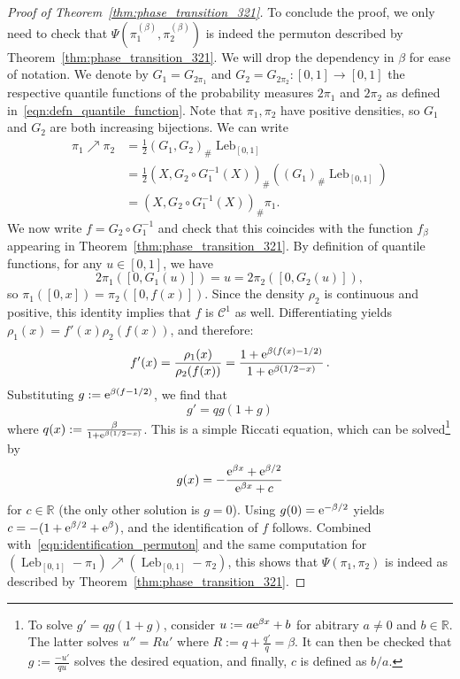 \documentclass[a4paper,11pt]{amsart}
\newcommand{\ee}{\textup{e}}
\newcommand{\R}{\mathbb R}
\DeclareMathOperator{\Leb}{Leb}
\theoremstyle{definition}
\begin{document}
\begin{proof}[Proof of Theorem~\ref{thm:phase_transition_321}]
    To conclude the proof, we only need to check that $\Psi\left( \pi_1^{(\beta)}, \pi_2^{(\beta)} \right)$ is indeed the permuton described by Theorem~\ref{thm:phase_transition_321}. We will drop the dependency in $\beta$ for ease of notation. We denote by $G_1 = G_{2\pi_1}$ and $G_2=G_{2\pi_2} : \left[0,1 \right] \to [0,1]$ the respective quantile functions of the probability measures $2\pi_1$ and $2\pi_2$ as defined in~\eqref{eqn:defn_quantile_function}. Note that $\pi_1, \pi_2$ have positive densities, so $G_1$ and $G_2$ are both increasing bijections. We can write
    \begin{align}
    	\pi_1 \nearrow \pi_2 &= \frac{1}{2} \left( G_1, G_2 \right)_{\#}  \Leb_{[0,1]} \nonumber \\
    	&= \frac{1}{2} \left( X, G_2 \circ G_1^{-1}(X) \right)_{\#} \left( (G_1)_{\#} \Leb_{[0,1]}\right) \nonumber \\
    	&=  \left( X, G_2 \circ G_1^{-1}(X) \right)_{\#} \pi_1. \label{eqn:identification_permuton}
    \end{align}
    We now write $f=G_2 \circ G_1^{-1}$ and check that this coincides with the function $f_{\beta}$ appearing in Theorem~\ref{thm:phase_transition_321}. By definition of quantile functions, for any $u \in [0,1]$, we have
    \[ 2\pi_1 \left( \left[ 0,G_1(u)\right] \right) = u = 2\pi_2 \left( \left[ 0,G_2(u)\right] \right), \]
    so $\pi_1([0,x]) = \pi_2([0,f(x)])$. Since the density $\rho_2$ is continuous and positive, this identity implies that $f$ is $\mathcal C^1$ as well.
    Differentiating yields $\rho_1(x) = f'(x) \rho_2(f(x))$, and therefore:
    \begin{equation*}
    f'(x) = \frac{\rho_1(x)}{\rho_2(f(x))} = \frac{1 + \ee^{\beta(f(x)-1/2)}}{1 + \ee^{\beta(1/2-x)}} \,.
    \end{equation*}
    Substituting $g := \ee^{\beta(f-1/2)}$, we find that
    \begin{equation*}
    g' = q g (1+g)
    \end{equation*}
    where $q(x) := \frac{\beta}{1 + \ee^{\beta(1/2-x)}}$.
    This is a simple Riccati equation, which can be solved\footnote{To solve $g'=qg(1+g)$, consider $u := a\ee^{\beta x}+b$ for abitrary $a\ne0$ and $b\in\R$.
    The latter solves $u'' = R u'$ where $R := q + \frac{q'}{q} = \beta$.
    It can then be checked that $g := \frac{-u'}{qu}$ solves the desired equation, and finally, $c$ is defined as $b/a$.} by
    \begin{equation*}
    g(x) = - \frac{\ee^{\beta x} + \ee^{\beta/2}}{\ee^{\beta x} + c}
    \end{equation*}
    for $c\in\R$ (the only other solution is $g=0$).
    Using $g(0) = \ee^{-\beta/2}$ yields $c = -(1+\ee^{\beta/2}+\ee^\beta)$, and the identification of $f$ follows. 
    Combined with~\eqref{eqn:identification_permuton} and the same computation for $(\Leb_{[0,1]}-\pi_1) \nearrow (\Leb_{[0,1]}-\pi_2)$, this shows that $\Psi(\pi_1,\pi_2)$ is indeed as described by Theorem~\ref{thm:phase_transition_321}.
\end{proof}
\end{document}
